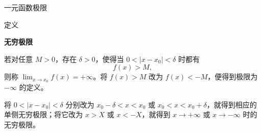 \documentclass[aspectratio=169,10pt,fontset=fandol]{ctexbeamer}
\newenvironment{warning}{\par\noindent\textbf{注：}\quad}{\par\vspace{0.8em}}
\begin{document}
\begin{frame}[t,fragile]{一元函数极限}
\normalsize
\begin{block}{定义}
{\normalsize
\textbf{无穷极限}\par

若对任意 \(M>0\)，存在 \(\delta>0\)，使得当 \(0<|x-x_0|<\delta\) 时都有
\[
f(x)>M,
\]
则称 \(\lim_{x\to x_0}f(x)=+\infty\)。将 \(f(x)>M\) 改为 \(f(x)<-M\)，便得到极限为 \(-\infty\) 的定义。

将 \(0<|x-x_0|<\delta\) 分别改为 \(x_0-\delta<x<x_0\) 或 \(x_0<x<x_0+\delta\)，就得到相应的单侧无穷极限；将它改为 \(x>X\) 或 \(x<-X\)，就得到 \(x\to+\infty\) 或 \(x\to-\infty\) 时的无穷极限。

}
\end{block}
\end{frame}
\end{document}
